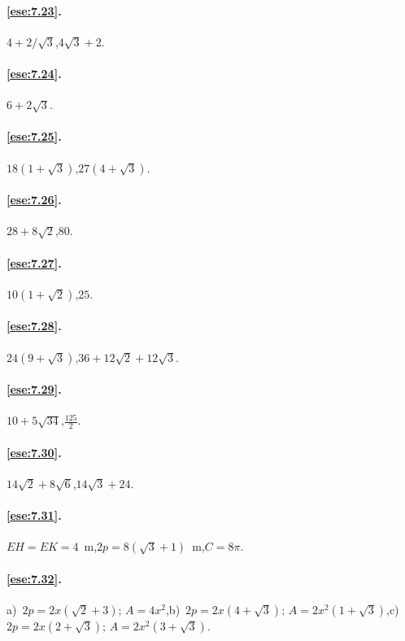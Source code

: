 \paragraph{\ref{ese:7.23}.}
$4+2/\sqrt{3}$,\quad $4\sqrt{3}+2$.

\paragraph{\ref{ese:7.24}.}
$6+2\sqrt{3}$.

\paragraph{\ref{ese:7.25}.}
$18(1+\sqrt{3})$,\quad $27(4+\sqrt{3})$.

\paragraph{\ref{ese:7.26}.}
$28+8\sqrt{2}$,\quad $80$.

\paragraph{\ref{ese:7.27}.}
$10(1+\sqrt{2})$,\quad $25$.

\paragraph{\ref{ese:7.28}.}
$24(9+\sqrt{3})$,\quad $36+12\sqrt{2}+12\sqrt{3}$.

\paragraph{\ref{ese:7.29}.}
$10+5\sqrt{34}$,\quad $\frac{125}{2}$.

\paragraph{\ref{ese:7.30}.}
$14\sqrt{2}+8\sqrt{6}$,\quad $14\sqrt{3}+24$.

\paragraph{\ref{ese:7.31}.}
$EH=EK=4$~m,\quad $2p=8(\sqrt{3}+1)$~m,\quad $C=8\pi$.

\paragraph{\ref{ese:7.32}.}
a)~$2p=2x(\sqrt{2}+3)$; $A=4x^2$,\quad b)~$2p=2x(4+\sqrt{3})$; $A=2x^2(1+\sqrt{3})$,\quad c)~$2p=2x(2+\sqrt{3})$; $A=2x^2(3+\sqrt{3})$.


